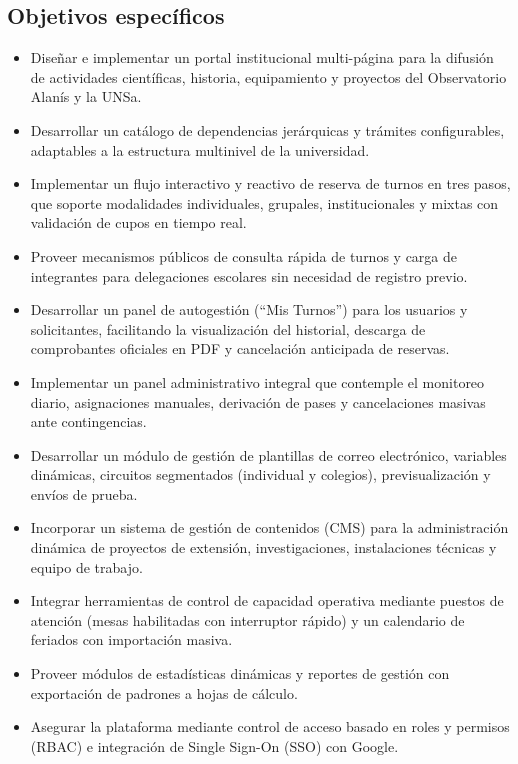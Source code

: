 \subsection{Objetivos específicos}
\begin{itemize}
    \item Diseñar e implementar un portal institucional multi-página para la difusión de actividades científicas, historia, equipamiento y proyectos del Observatorio Alanís y la UNSa.
    \item Desarrollar un catálogo de dependencias jerárquicas y trámites configurables, adaptables a la estructura multinivel de la universidad.
    \item Implementar un flujo interactivo y reactivo de reserva de turnos en tres pasos, que soporte modalidades individuales, grupales, institucionales y mixtas con validación de cupos en tiempo real.
    \item Proveer mecanismos públicos de consulta rápida de turnos y carga de integrantes para delegaciones escolares sin necesidad de registro previo.
    \item Desarrollar un panel de autogestión (``Mis Turnos'') para los usuarios y solicitantes, facilitando la visualización del historial, descarga de comprobantes oficiales en PDF y cancelación anticipada de reservas.
    \item Implementar un panel administrativo integral que contemple el monitoreo diario, asignaciones manuales, derivación de pases y cancelaciones masivas ante contingencias.
    \item Desarrollar un módulo de gestión de plantillas de correo electrónico, variables dinámicas, circuitos segmentados (individual y colegios), previsualización y envíos de prueba.
    \item Incorporar un sistema de gestión de contenidos (CMS) para la administración dinámica de proyectos de extensión, investigaciones, instalaciones técnicas y equipo de trabajo.
    \item Integrar herramientas de control de capacidad operativa mediante puestos de atención (mesas habilitadas con interruptor rápido) y un calendario de feriados con importación masiva.
    \item Proveer módulos de estadísticas dinámicas y reportes de gestión con exportación de padrones a hojas de cálculo.
    \item Asegurar la plataforma mediante control de acceso basado en roles y permisos (RBAC) e integración de Single Sign-On (SSO) con Google.
\end{itemize}

